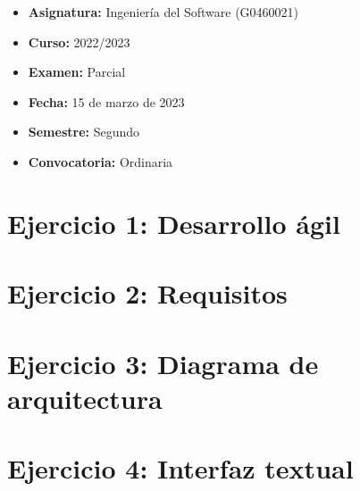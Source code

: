 \begin{itemize}
    \item \textbf{Asignatura:} Ingeniería del Software (G0460021)
    \item \textbf{Curso:} 2022/2023
    \item \textbf{Examen:} Parcial
    \item \textbf{Fecha:} 15 de marzo de 2023
    \item \textbf{Semestre:} Segundo
    \item \textbf{Convocatoria:} Ordinaria
\end{itemize}


\section{Ejercicio 1: Desarrollo ágil}\label{sec:ejercicio-1}


\section{Ejercicio 2: Requisitos}\label{sec:ejercicio-2-ex2023}


\section{Ejercicio 3: Diagrama de arquitectura}\label{sec:ejercicio-3-ex2023}


\section{Ejercicio 4: Interfaz textual}\label{sec:ejercicio-4-ex2023}


